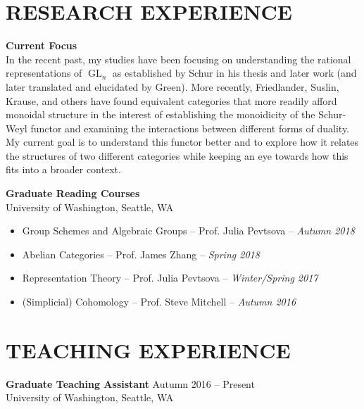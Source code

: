 \documentclass[margin]{res} %
\begin{document}
\begin{resume}

\section{RESEARCH EXPERIENCE}

{\bf Current Focus}\\
In the recent past, my studies have been focusing on understanding the rational representations of $\operatorname{GL}_n$ as established by Schur in his thesis 
and later work (and later translated and elucidated by Green). More recently, Friedlander, Suslin, Krause,
and others have found equivalent categories that more readily afford monoidal structure in the interest of establishing the monoidicity 
of the Schur-Weyl functor and examining the interactions between different forms of duality. My current goal is to understand this functor better and to 
explore how it relates the structures of two different categories while keeping an eye towards how this fits into a broader context.

{\bf Graduate Reading Courses} \\
University of Washington, Seattle, WA
\begin{itemize} \itemsep -1pt %
	\item Group Schemes and Algebraic Groups -- Prof. Julia Pevtsova -- {\sl Autumn 2018}
	\item Abelian Categories -- Prof. James Zhang -- {\sl Spring 2018}
	\item Representation Theory -- Prof. Julia Pevtsova -- {\sl Winter/Spring 2017}
	\item (Simplicial) Cohomology -- Prof. Steve Mitchell -- {\sl Autumn 2016}
\end{itemize}

\newpage
 
\section{TEACHING EXPERIENCE}

{\bf Graduate Teaching Assistant} \hfill Autumn 2016 -- Present \\
University of Washington, Seattle, WA


\end{resume}
\end{document}
